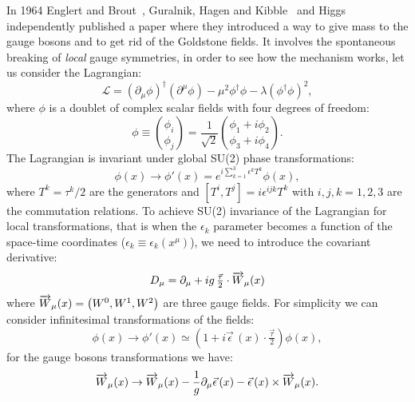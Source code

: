 In 1964 Englert and Brout~\cite{EnglertBroutPaper}, Guralnik, Hagen and
Kibble~\cite{GuralnikPaper} and Higgs~\cite{HiggsPaper} independently published
a paper where they introduced a way to give mass to the gauge bosons and to get
rid of the Goldstone fields. It involves the spontaneous breaking of
\emph{local} gauge symmetries, in order to see how the mechanism works, let us
consider the Lagrangian:
\begin{equation}
  \label{eq:33}
  \mathcal{L} =(\partial_{\mu} \phi)^{\dagger}(\partial^{\mu} \phi) -
  \mu^{2}\phi^{\dagger}\phi - \lambda (\phi^{\dagger}\phi)^{2},
\end{equation}
where $\phi$ is a doublet of complex scalar fields with four degrees of freedom:
\begin{equation}
  \label{eq:34}
  \phi \equiv \binom{\phi_{i}}{\phi_{j}} = \frac{1}{\sqrt{2}}
  \binom{\phi_{1} + i \phi_{2}}{\phi_{3} + i \phi_{4}}.
\end{equation}
The Lagrangian is invariant under global SU(2) phase transformations:
\begin{equation}
  \label{eq:32}
  \phi(x) \rightarrow \phi'(x) = e^{i \sum_{k = 1}^{3} \epsilon^{k} T^{k}}
  \phi(x),
\end{equation}
where $T^{k} = \tau^k/2$ are the generators and
$[T^{i},T^{j}] = i \epsilon^{ijk}T^{k}$ with $i,j,k = 1,2,3$ are the commutation
relations. To achieve SU(2) invariance of the Lagrangian for local
transformations, that is when the $\epsilon_k$ parameter becomes a function of
the space-time coordinates ($\epsilon_k \equiv \epsilon_k (x^\mu)$), we need to
introduce the covariant derivative:
\begin{equation}
  \label{eq:35}
  D_{\mu} = \partial_{\mu} + i g\,\tfrac{\vec \tau}{2} \cdot \overrightarrow{W}_{\mu}(x)
\end{equation}
where $\overrightarrow{W}_{\mu}(x) = \left( W^0, W^1, W^2 \right)$ are three gauge
fields. For simplicity we can consider infinitesimal transformations of the
fields:
\begin{equation}
  \label{eq:36}
  \phi(x) \rightarrow \phi'(x) \simeq \left( 1 + i \vec \epsilon\, (x) \cdot
    \tfrac{\vec \tau}{2} \right) \phi(x),
\end{equation}
for the gauge bosons transformations we have:
\begin{equation}
  \label{eq:37}
  \overrightarrow{W}_{\mu} (x) \rightarrow \overrightarrow{W}_{\mu}(x) -
  \frac{1}{g} \partial_{\mu} \vec \epsilon \, (x) - \vec \epsilon\,(x)
  \times \overrightarrow{W}_{\mu} (x).
\end{equation}
